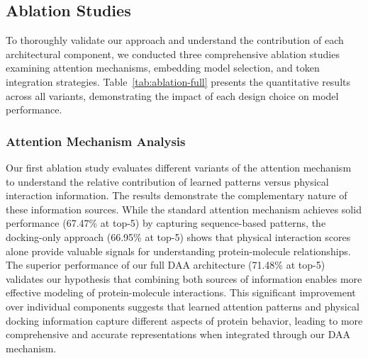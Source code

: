 \documentclass[sigconf]{acmart}
\begin{document}
\subsection{Ablation Studies}



To thoroughly validate our approach and understand the contribution of each architectural component, we conducted three comprehensive ablation studies examining attention mechanisms, embedding model selection, and token integration strategies. Table~\ref{tab:ablation-full} presents the quantitative results across all variants, demonstrating the impact of each design choice on model performance.

\subsubsection{Attention Mechanism Analysis}
Our first ablation study evaluates different variants of the attention mechanism to understand the relative contribution of learned patterns versus physical interaction information. The results demonstrate the complementary nature of these information sources. While the standard attention mechanism achieves solid performance (67.47\% at top-5) by capturing sequence-based patterns, the docking-only approach (66.95\% at top-5) shows that physical interaction scores alone provide valuable signals for understanding protein-molecule relationships. The superior performance of our full DAA architecture (71.48\% at top-5) validates our hypothesis that combining both sources of information enables more effective modeling of protein-molecule interactions. This significant improvement over individual components suggests that learned attention patterns and physical docking information capture different aspects of protein behavior, leading to more comprehensive and accurate representations when integrated through our DAA mechanism.
\end{document}
